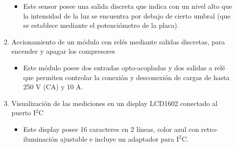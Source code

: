 \documentclass[
11pt, %
]{charter}
\begin{document}
\begin{enumerate}
\begin{enumerate}
                \begin{itemize}
                   \item Este sensor posee una salida discreta que indica con un nivel alto que la intensidad de la luz se encuentra por debajo de cierto umbral (que se establece mediante el potenciómetro de la placa).
               \end{itemize}
			\item Accionamiento de un módulo con relés mediante salidas discretas, para encender y apagar los compresores
                \begin{itemize}
                   \item Este módulo posee dos entradas opto-acopladas y dos salidas a relé que permiten controlar la conexión y desconexión de cargas de hasta 250 V (CA) y 10 A.
               \end{itemize}
			\item Visualización de las mediciones en un display LCD1602 conectado al puerto I$^2$C
                \begin{itemize}
                   \item Este display posee 16 caracteres en 2 líneas, color azul con retro-iluminación ajustable e incluye un adaptador para I$^2$C.
               \end{itemize}
   

\end{enumerate}
\end{enumerate}
\end{document}
